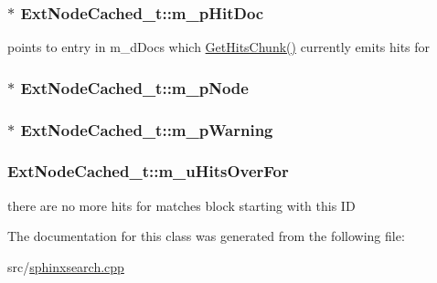 \hypertarget{classExtNodeCached__t_a3db29986e63869150824a3966835df93}{
\subsubsection[{m\-\_\-p\-Hit\-Doc}]{$\ast$ Ext\-Node\-Cached\-\_\-t\-::m\-\_\-p\-Hit\-Doc\hspace{0.3cm}{\ttfamily [private]}}}\label{classExtNodeCached__t_a3db29986e63869150824a3966835df93}


points to entry in m\-\_\-d\-Docs which \hyperlink{classExtNodeCached__t_a0b357bc4f7153168b4919433a4ffb747}{Get\-Hits\-Chunk()} currently emits hits for 

\hypertarget{classExtNodeCached__t_ad6f644a8b54f3f30f8fbc46b4f8b41b5}{
\subsubsection[{m\-\_\-p\-Node}]{$\ast$ Ext\-Node\-Cached\-\_\-t\-::m\-\_\-p\-Node\hspace{0.3cm}{\ttfamily [private]}}}\label{classExtNodeCached__t_ad6f644a8b54f3f30f8fbc46b4f8b41b5}
\hypertarget{classExtNodeCached__t_a81332257ff6e159ba82b8103ae1dc317}{
\subsubsection[{m\-\_\-p\-Warning}]{$\ast$ Ext\-Node\-Cached\-\_\-t\-::m\-\_\-p\-Warning\hspace{0.3cm}{\ttfamily [private]}}}\label{classExtNodeCached__t_a81332257ff6e159ba82b8103ae1dc317}
\hypertarget{classExtNodeCached__t_a84a67429327afeaaa967f5f5a9fa4ad6}{
\subsubsection[{m\-\_\-u\-Hits\-Over\-For}]{ Ext\-Node\-Cached\-\_\-t\-::m\-\_\-u\-Hits\-Over\-For\hspace{0.3cm}{\ttfamily [private]}}}\label{classExtNodeCached__t_a84a67429327afeaaa967f5f5a9fa4ad6}


there are no more hits for matches block starting with this I\-D 



The documentation for this class was generated from the following file\-:\begin{DoxyCompactItemize}
\item 
src/\hyperlink{sphinxsearch_8cpp}{sphinxsearch.\-cpp}\end{DoxyCompactItemize}
